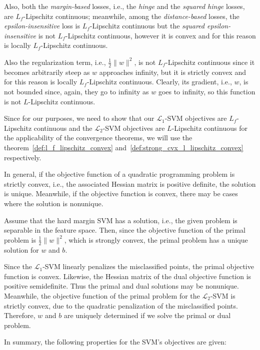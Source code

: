 Also, both the \emph{margin-based} losses, i.e., the \emph{hinge} and the \emph{squared hinge} losses, are $L_f$-Lipschitz continuous; meanwhile, among the \emph{distance-based} losses, the \emph{epsilon-insensitive} loss is $L_f$-Lipschitz continuous but the \emph{squared epsilon-insensitive} is not $L_f$-Lipschitz continuous, however it is convex and for this reason is locally $L_f$-Lipschitz continuous. 

Also the regularization term, i.e., $\displaystyle \frac{1}{2} \| w \|^2$, is not $L_f$-Lipschitz continuous since it becomes arbitrarily steep as $w$ approaches infinity, but it is strictly convex and for this reason is locally $L_f$-Lipschitz continuous. Clearly, its gradient, i.e., $w$, is not bounded since, again, they go to infinity as $w$ goes to infinity, so this function is not $L$-Lipschitz continuous.

Since for our purposes, we need to show that our $\mathcal{L}_1$-SVM objectives are $L_f$-Lipschitz continuous and the $\mathcal{L}_2$-SVM objectives are $L$-Lipschitz continuous for the applicability of the convergence theorems, we will use the theorem~\ref{def:l_f_lipschitz_convex} and~\ref{def:strong_cvx_l_lipschitz_convex} respectively.

In general, if the objective function of a quadratic programming problem is strictly convex, i.e., the associated Hessian matrix is positive definite, the solution is unique. Meanwhile, if the objective function is convex, there may be cases where the solution is nonunique.

Assume that the hard margin SVM has a solution, i.e., the given problem is separable in the feature space. Then, since the objective function of the primal problem is $\displaystyle \frac{1}{2} \| w \|^2$, which is strongly convex, the primal problem has a unique solution for $w$ and $b$.

Since the $\mathcal{L}_1$-SVM linearly penalizes the misclassified points, the primal objective function is convex. Likewise, the Hessian matrix of the dual objective function is positive semidefinite. Thus the primal and dual solutions may be nonunique. Meanwhile, the objective function of the primal problem for the $\mathcal{L}_2$-SVM is strictly convex, due to the quadratic penalization of the misclassified points. Therefore, $w$ and $b$ are uniquely determined if we solve the primal or dual problem. 

In summary, the following properties for the SVM's objectives are given:

